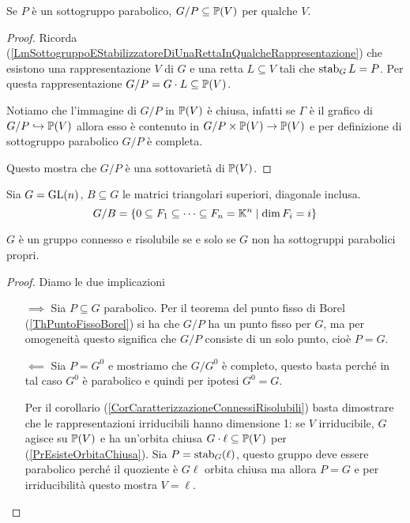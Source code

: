\begin{remark}
Se $P$ \`e un sottogruppo parabolico, $G/P\subseteq \mathbb{P}(V)$ per qualche $V$.
\end{remark}
\begin{proof}
Ricorda (\ref{LmSottogruppoEStabilizzatoreDiUnaRettaInQualcheRappresentazione}) che esistono una rappresentazione $V$ di $G$ e una retta $L\subseteq V$ tali che $\operatorname{stab}_G L=P$. Per questa rappresentazione $G/P=G\cdot L\subseteq \mathbb{P}(V)$.

Notiamo che l'immagine di $G/P$ in $\mathbb{P}(V)$ \`e chiusa, infatti se $\Gamma$ \`e il grafico di $G/P\hookrightarrow \mathbb{P}(V)$ allora esso \`e contenuto in $G/P \times \mathbb{P}(V)\to \mathbb{P}(V)$ e per definizione di sottogruppo parabolico $G/P$ \`e completa.

Questo mostra che $G/P$ \`e una sottovariet\`a di $\mathbb{P}(V)$.
\end{proof}

\begin{example}
Sia $G=\mathrm{GL}(n)$, $B\subseteq G$ le matrici triangolari superiori, diagonale inclusa.
\[G/B=\left\{{0\subseteq F_1\subseteq \cdots\subseteq F_n=\mathbb{K}^n\mid \dim F_i=i}\right\}\]
\end{example}

\begin{lemma}\label{LmConnessoRisolubileSSENoSottogruppiParabolici}
$G$ \`e un gruppo connesso e risolubile se e solo se $G$ non ha sottogruppi parabolici propri.
\end{lemma}
\begin{proof}
Diamo le due implicazioni
\setlength{\leftmargini}{0cm}
\begin{itemize}
\item[$\boxed{\implies}$] Sia $P\subseteq G$ parabolico. Per il teorema del punto fisso di Borel (\ref{ThPuntoFissoBorel}) si ha che $G/P$ ha un punto fisso per $G$, ma per omogeneit\`a questo significa che $G/P$ consiste di un solo punto, cio\`e $P=G$.
\item[$\boxed{\impliedby}$] Sia $P=G^0$ e mostriamo che $G/G^0$ \`e completo, questo basta perch\'e in tal caso $G^0$ \`e parabolico e quindi per ipotesi $G^0=G$.

Per il corollario (\ref{CorCaratterizzazioneConnessiRisolubili}) basta dimostrare che le rappresentazioni irriducibili hanno dimensione 1: se $V$ irriducibile, $G$ agisce su $\mathbb{P}(V)$ e ha un'orbita chiusa $G\cdot \ell\subseteq\mathbb{P}(V)$ per (\ref{PrEsisteOrbitaChiusa}). Sia $P=\operatorname{stab}_G(\ell)$, questo gruppo deve essere parabolico perch\'e il quoziente \`e $G\ell$ orbita chiusa ma allora $P=G$ e per irriducibilit\`a questo mostra $V=\ell$.
\end{itemize}
\setlength{\leftmargini}{0.5cm}
\end{proof}


